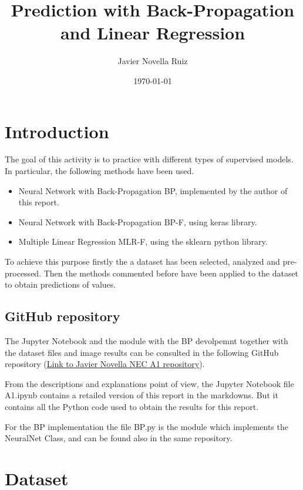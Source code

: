 \documentclass[11pt, a4paper]{article}
\title{Prediction with Back-Propagation and Linear Regression }
\author{Javier Novella Ruiz}
\date{\today}
\begin{document}


\tableofcontents

\newpage

\section{Introduction}

The goal of this activity is to practice with different types of supervised models. In particular, the following methods have been used. 
\begin{itemize}
    \item Neural Network with Back-Propagation BP, implemented by the author of this report.
    \item Neural Network with Back-Propagation BP-F, using keras library.
    \item Multiple Linear Regression MLR-F, using the sklearn python library.
\end{itemize}

To achieve this purpose firstly the a dataset has been selected, analyzed and pre-processed. Then the methods commented before have been
applied to the dataset to obtain predictions of values.

\subsection{GitHub repository}

The Jupyter Notebook and the module with the BP devolpemnt together with the dataset files and image results can be consulted in
the following GitHub repository (\href{https://github.com/novella93/NEC_A1}{Link to Javier Novella NEC A1 repository}).

\vspace{1em} From the descriptions and explanations point of view, the Jupyter Notebook file A1.ipynb contains a retailed version of this 
report in the markdowns. But it contains all the Python code used to obtain the results for this report.

\vspace{1em} For the BP implementation the file BP.py is the module which implements the NeuralNet Class, and can be found also in the same
repository.

\newpage

\section{Dataset}
\end{document}
